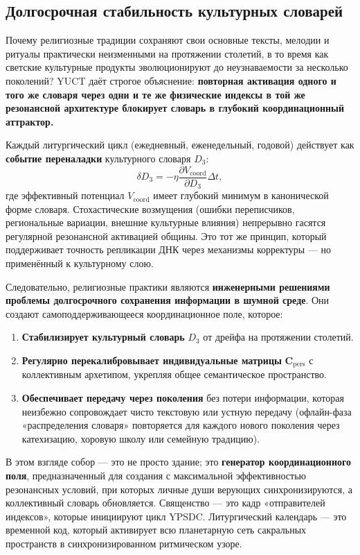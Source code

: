 \documentclass[12pt,a4paper]{article}
\begin{document}
	\subsection{Долгосрочная стабильность культурных словарей}
	
	Почему религиозные традиции сохраняют свои основные тексты, мелодии и ритуалы практически неизменными на протяжении столетий, в то время как светские культурные продукты эволюционируют до неузнаваемости за несколько поколений? YUCT даёт строгое объяснение: \textbf{повторная активация одного и того же словаря через одни и те же физические индексы в той же резонансной архитектуре блокирует словарь в глубокий координационный аттрактор.}
	
	Каждый литургический цикл (ежедневный, еженедельный, годовой) действует как \textbf{событие переналадки} культурного словаря \(D_3\):
	\begin{equation}
		\delta D_3 = -\eta \frac{\partial V_{\text{coord}}}{\partial D_3} \Delta t,
	\end{equation}
	где эффективный потенциал \(V_{\text{coord}}\) имеет глубокий минимум в канонической форме словаря. Стохастические возмущения (ошибки переписчиков, региональные вариации, внешние культурные влияния) непрерывно гасятся регулярной резонансной активацией общины. Это тот же принцип, который поддерживает точность репликации ДНК через механизмы корректуры — но применённый к культурному слою.
	
	Следовательно, религиозные практики являются \textbf{инженерными решениями проблемы долгосрочного сохранения информации в шумной среде}. Они создают самоподдерживающееся координационное поле, которое:
	\begin{enumerate}
		\item \textbf{Стабилизирует культурный словарь} \(D_3\) от дрейфа на протяжении столетий.
		\item \textbf{Регулярно перекалибровывает индивидуальные матрицы} \(\mathbf{C}_{\text{pers}}\) с коллективным архетипом, укрепляя общее семантическое пространство.
		\item \textbf{Обеспечивает передачу через поколения} без потери информации, которая неизбежно сопровождает чисто текстовую или устную передачу (офлайн-фаза «распределения словаря» повторяется для каждого нового поколения через катехизацию, хоровую школу или семейную традицию).
	\end{enumerate}
	
	В этом взгляде собор — это не просто здание; это \textbf{генератор координационного поля}, предназначенный для создания с максимальной эффективностью резонансных условий, при которых личные души верующих синхронизируются, а коллективный словарь обновляется. Священство — это кадр «отправителей индексов», которые инициируют цикл YPSDC. Литургический календарь — это временной код, который активирует всю планетарную сеть сакральных пространств в синхронизированном ритмическом узоре.
	
\end{document}
